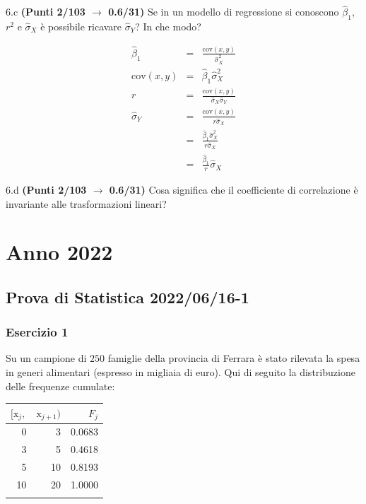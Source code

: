 \documentclass[
  11pt,
]{book}
\theoremstyle{mytheoremstyle}
\theoremstyle{mydefstyle}
\newenvironment{sol}
  {
  \begin{tcolorbox}[enhanced,breakable,arc=0.1mm,boxrule=1pt,colback=white,colframe=iblue,
  title=\bf \fontfamily{lmss}\selectfont \hspace{.5 cm} Soluzione,drop fuzzy shadow]

}{
\end{tcolorbox}
  }
\begin{document}
6.c \textbf{(Punti 2/103 \(\rightarrow\) 0.6/31)} Se in un modello di regressione si conoscono \(\hat\beta_1\), \(r^2\) e \(\hat\sigma_X\) è possibile ricavare \(\hat\sigma_Y\)? In che modo?

\begin{sol}
\begin{eqnarray*}
   \hat\beta_1 &=& \frac{\text{cov}(x,y)}{\hat\sigma_X^2}\\
   \text{cov}(x,y)&=&\hat\beta_1\hat\sigma_X^2\\
   r&=&\frac{\text{cov}(x,y)}{\hat\sigma_X\hat\sigma_Y}\\
   \hat\sigma_Y&=&\frac{\text{cov}(x,y)}{r\hat\sigma_X}\\
   &=&\frac{\hat\beta_1\hat\sigma_X^2}{r\hat\sigma_X}\\
   &=&\frac{\hat\beta_1}{r}\hat\sigma_X
\end{eqnarray*}

\end{sol}

6.d \textbf{(Punti 2/103 \(\rightarrow\) 0.6/31)} Cosa significa che il coefficiente di correlazione è invariante alle trasformazioni lineari?

\chapter{Anno 2022}\label{anno-2022}

\section{Prova di Statistica 2022/06/16-1}\label{prova-di-statistica-20220616-1}

\subsection{Esercizio 1}\label{esercizio-1-10}

Su un campione di \(250\) famiglie della provincia di Ferrara è stato rilevata la spesa in generi alimentari (espresso in migliaia di euro). Qui di seguito la distribuzione delle frequenze cumulate:

\begin{sol}

\begin{table}[H]
\centering
\begin{tabular}{rrr}
\toprule
$[\text{x}_j,$ & $\text{x}_{j+1})$ & $F_j$\\
\midrule
0 & 3 & 0.0683\\
3 & 5 & 0.4618\\
5 & 10 & 0.8193\\
10 & 20 & 1.0000\\
 &  & \\
\bottomrule
\end{tabular}
\end{table}

\end{sol}
\end{document}
